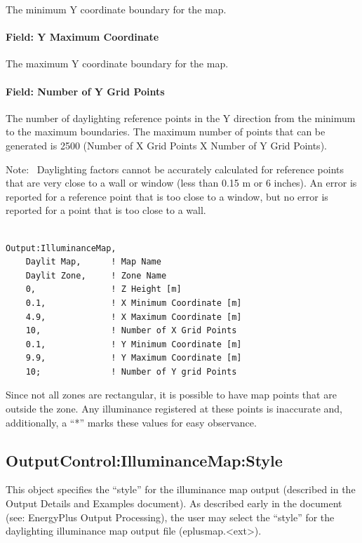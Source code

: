 The minimum Y coordinate boundary for the map.

\paragraph{Field: Y Maximum Coordinate}\label{field-y-maximum-coordinate}

The maximum Y coordinate boundary for the map.

\paragraph{Field: Number of Y Grid Points}\label{field-number-of-y-grid-points}

The number of daylighting reference points in the Y direction from the minimum to the maximum boundaries. The maximum number of points that can be generated is 2500 (Number of X Grid Points X Number of Y Grid Points).

Note:~ Daylighting factors cannot be accurately calculated for reference points that are very close to a wall or window (less than 0.15 m or 6 inches). An error is reported for a reference point that is too close to a window, but no error is reported for a point that is too close to a wall.

\begin{lstlisting}

Output:IlluminanceMap,
    Daylit Map,      ! Map Name
    Daylit Zone,     ! Zone Name
    0,               ! Z Height [m]
    0.1,             ! X Minimum Coordinate [m]
    4.9,             ! X Maximum Coordinate [m]
    10,              ! Number of X Grid Points
    0.1,             ! Y Minimum Coordinate [m]
    9.9,             ! Y Maximum Coordinate [m]
    10;              ! Number of Y grid Points
\end{lstlisting}

Since not all zones are rectangular, it is possible to have map points that are outside the zone. Any illuminance registered at these points is inaccurate and, additionally, a ``*'' marks these values for easy observance.

\subsection{OutputControl:IlluminanceMap:Style}\label{outputcontrolilluminancemapstyle}

This object specifies the ``style'' for the illuminance map output (described in the Output Details and Examples document). As described early in the document (see: EnergyPlus Output Processing), the user may select the ``style'' for the daylighting illuminance map output file (eplusmap.\textless{}ext\textgreater{}).

